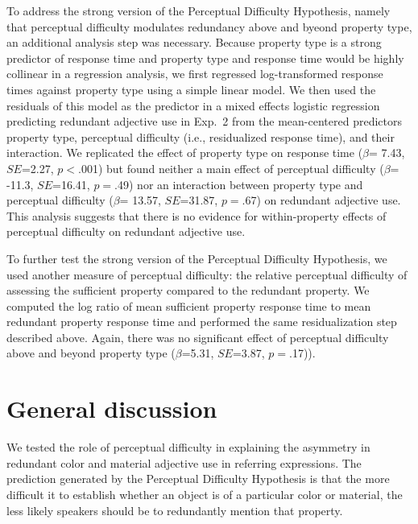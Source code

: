 \documentclass[12pt,letterpaper]{article}
\begin{document}
To address the strong version of the Perceptual Difficulty Hypothesis, namely that perceptual difficulty modulates redundancy above and byeond property type, an additional analysis step was necessary. Because property type is a strong predictor of response time and property type and response time would be highly collinear in a regression analysis, we first regressed log-transformed response times against property type using a simple linear model. %
We then used the residuals of this model as the predictor in a mixed effects logistic regression predicting redundant adjective use in Exp.~2 from the mean-centered predictors  property type, perceptual difficulty (i.e., residualized response time), and their interaction. We replicated the effect of property type on response time ($\beta$= 7.43, $SE$=2.27, $p$$<$.001) but found neither a main effect of perceptual difficulty ($\beta$= -11.3, $SE$=16.41, $p$$=$.49) nor an interaction between property type and perceptual difficulty ($\beta$= 13.57, $SE$=31.87, $p$$=$.67) on redundant adjective use. This analysis suggests that there is no evidence for within-property effects of perceptual difficulty on redundant adjective use.

To further test the strong version of the Perceptual Difficulty Hypothesis, we used another measure of perceptual difficulty: the relative perceptual difficulty of assessing the sufficient property compared to the redundant property. We computed the log ratio of mean sufficient property response time to   mean redundant property response time and performed the same residualization step described above. Again, there was no significant effect of perceptual difficulty above and beyond property type ($\beta$=5.31, $SE$=3.87, $p$$=$.17)).


\section{General discussion} 

We tested the role of perceptual difficulty in explaining the asymmetry in redundant color and material adjective use in referring expressions. The prediction generated by the Perceptual Difficulty Hypothesis is that the more difficult it to establish whether an object is of a particular color or material, the less likely speakers should be to redundantly mention that property.
\end{document}
